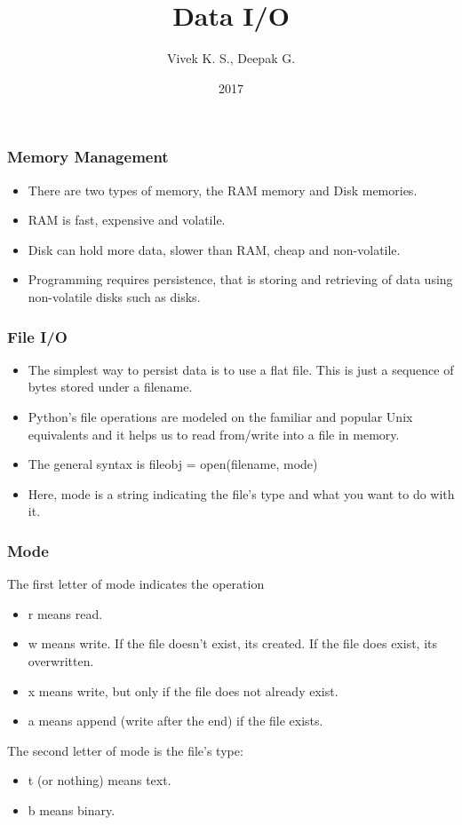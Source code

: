 \documentclass{beamer}
\title{Data I/O}
\author{Vivek K. S., Deepak G.}
\institute{Information Systems Decision Sciences (ISDS)\\
MUMA College of Business\\
University of South Florida \\
Tampa, Florida}
\date{2017}
\begin{document}
\frame{\titlepage}

\begin{frame}
\frametitle{Memory Management}
\begin{itemize}
\item There are two types of memory, the RAM memory and Disk memories.
\item RAM is fast, expensive and volatile.
\item Disk can hold more data, slower than RAM, cheap and non-volatile.
\item Programming requires persistence, that is storing and retrieving of data using non-volatile disks such as disks.
\end{itemize}
\end{frame}

\begin{frame}
\frametitle{File I/O}
\begin{itemize}
\item The simplest way to persist data is to use a flat file. This is just a sequence of bytes stored under a filename.
\item Python's file operations are modeled on the familiar and popular Unix equivalents and it helps us to read from/write into a file in memory.
\item The general syntax is 
fileobj = open(filename, mode)
\item Here, mode is a string indicating the file’s type and what you want to do with it.

\end{itemize}
\end{frame}

\begin{frame}
\frametitle{Mode}
The first letter of mode indicates the operation
\begin{itemize}
\item r means read.
\item w means write. If the file doesn't exist, its created. If the file does exist, its overwritten.
\item x means write, but only if the file does not already exist.
\item a means append (write after the end) if the file exists.
\end{itemize}
The second letter of mode is the file’s type:
\begin{itemize}
\item t (or nothing) means text.
\item b means binary.
\end{itemize}
\end{frame}
\end{document}
